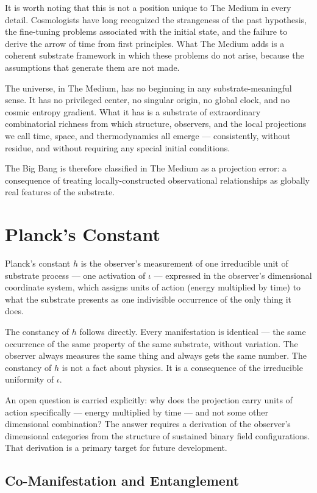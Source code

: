 \documentclass[11pt,letterpaper]{article}
\begin{document}
It is worth noting that this is not a position unique to The Medium in every detail. Cosmologists have long recognized the strangeness of the past hypothesis, the fine-tuning problems associated with the initial state, and the failure to derive the arrow of time from first principles. What The Medium adds is a coherent substrate framework in which these problems do not arise, because the assumptions that generate them are not made.

The universe, in The Medium, has no beginning in any substrate-meaningful sense. It has no privileged center, no singular origin, no global clock, and no cosmic entropy gradient. What it has is a substrate of extraordinary combinatorial richness from which structure, observers, and the local projections we call time, space, and thermodynamics all emerge — consistently, without residue, and without requiring any special initial conditions.

The Big Bang is therefore classified in The Medium as a projection error: a consequence of treating locally-constructed observational relationships as globally real features of the substrate.
\section{Planck's Constant}
\label{sec:org7313e76}

Planck's constant \(h\) is the observer's measurement of one irreducible unit of substrate process --- one activation of \(\iota\) --- expressed in the observer's dimensional coordinate system, which assigns units of action (energy multiplied by time) to what the substrate presents as one indivisible occurrence of the only thing it does.

The constancy of \(h\) follows directly. Every manifestation is identical --- the same occurrence of the same property of the same substrate, without variation. The observer always measures the same thing and always gets the same number. The constancy of \(h\) is not a fact about physics. It is a consequence of the irreducible uniformity of \(\iota\).

An open question is carried explicitly: why does the projection carry units of action specifically --- energy multiplied by time --- and not some other dimensional combination? The answer requires a derivation of the observer's dimensional categories from the structure of sustained binary field configurations. That derivation is a primary target for future development.
\subsection{Co-Manifestation and Entanglement}
\label{sec:orge53e8be}
\end{document}
